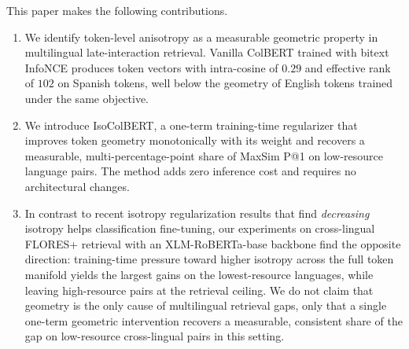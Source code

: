 This paper makes the following contributions.
\begin{enumerate}
    \item We identify token-level anisotropy as a measurable geometric property in multilingual late-interaction retrieval. Vanilla ColBERT trained with bitext InfoNCE produces token vectors with intra-cosine of $0.29$ and effective rank of $102$ on Spanish tokens, well below the geometry of English tokens trained under the same objective.
    \item We introduce IsoColBERT, a one-term training-time regularizer that improves token geometry monotonically with its weight and recovers a measurable, multi-percentage-point share of MaxSim P@1 on low-resource language pairs. The method adds zero inference cost and requires no architectural changes.
    \item In contrast to recent isotropy regularization results that find \emph{decreasing} isotropy helps classification fine-tuning, our experiments on cross-lingual FLORES+ retrieval with an XLM-RoBERTa-base backbone find the opposite direction: training-time pressure toward higher isotropy across the full token manifold yields the largest gains on the lowest-resource languages, while leaving high-resource pairs at the retrieval ceiling. We do not claim that geometry is the only cause of multilingual retrieval gaps, only that a single one-term geometric intervention recovers a measurable, consistent share of the gap on low-resource cross-lingual pairs in this setting.
\end{enumerate}

